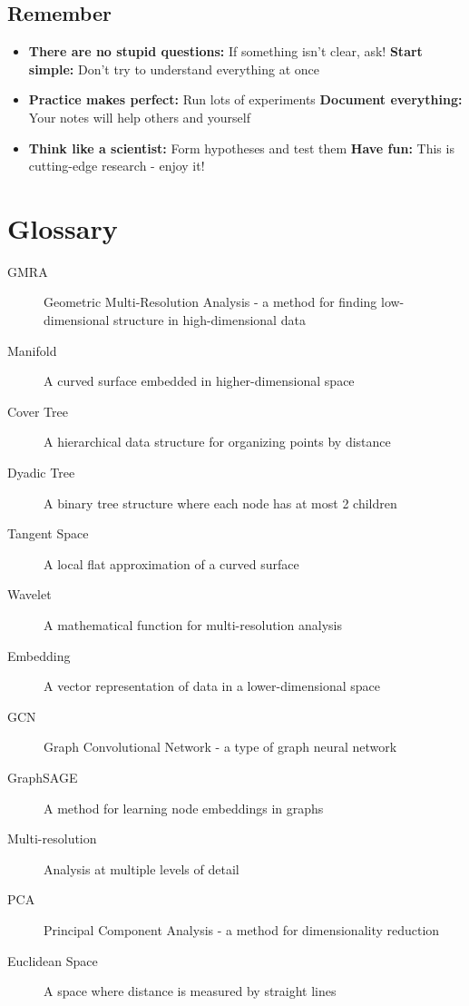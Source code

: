 \documentclass[12pt]{article}
\begin{document}
\subsection{Remember}

\begin{itemize}
    \item \textbf{There are no stupid questions:} If something isn't clear, ask!
    \textbf{Start simple:} Don't try to understand everything at once
    \item \textbf{Practice makes perfect:} Run lots of experiments
    \textbf{Document everything:} Your notes will help others and yourself
    \item \textbf{Think like a scientist:} Form hypotheses and test them
    \textbf{Have fun:} This is cutting-edge research - enjoy it!
\end{itemize}

\section{Glossary}

\begin{description}
    \item[GMRA] Geometric Multi-Resolution Analysis - a method for finding low-dimensional structure in high-dimensional data
    \item[Manifold] A curved surface embedded in higher-dimensional space
    \item[Cover Tree] A hierarchical data structure for organizing points by distance
    \item[Dyadic Tree] A binary tree structure where each node has at most 2 children
    \item[Tangent Space] A local flat approximation of a curved surface
    \item[Wavelet] A mathematical function for multi-resolution analysis
    \item[Embedding] A vector representation of data in a lower-dimensional space
    \item[GCN] Graph Convolutional Network - a type of graph neural network
    \item[GraphSAGE] A method for learning node embeddings in graphs
    \item[Multi-resolution] Analysis at multiple levels of detail
    \item[PCA] Principal Component Analysis - a method for dimensionality reduction
    \item[Euclidean Space] A space where distance is measured by straight lines
\end{description}
\end{document}
